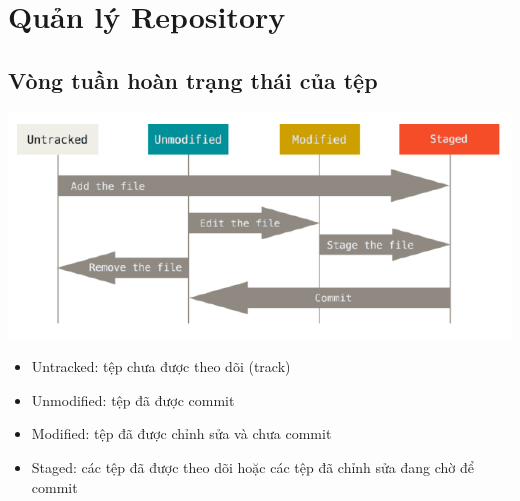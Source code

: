 \documentclass[12pt,a4paper]{report}
\begin{document}
\section{Quản lý Repository}

\subsection{Vòng tuần hoàn trạng thái của tệp}

	\includegraphics[width=0.8\linewidth]{screenshot006}
	
	\label{fig:screenshot006}
\begin{itemize}
\item Untracked: tệp chưa được theo dõi (track)
\item Unmodified: tệp đã được commit\vskip 0.4cm
\item Modified: tệp đã được chỉnh sửa và chưa commit
\item Staged: các tệp đã được theo dõi hoặc các tệp đã chỉnh sửa đang chờ để commit
\end{itemize}
\end{document}
